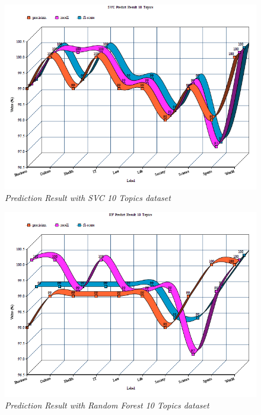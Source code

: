 \documentclass[conference]{IEEEtran}
\begin{document}
\begin{figure}[h]
\includegraphics[scale=0.45]{svc_predict.png}
\centering
\caption{\textit{Prediction Result with SVC 10 Topics dataset}}
\end{figure}

\begin{figure}[h]
\includegraphics[scale=0.45]{random_forest_predict.png}
\centering
\caption{\textit{Prediction Result with Random Forest 10 Topics dataset}}
\end{figure}
\end{document}
